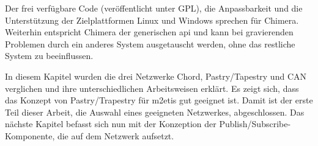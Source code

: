 Der frei verfügbare Code (veröffentlicht unter GPL), die Anpassbarkeit und die Unterstützung der Zielplattformen Linux und Windows sprechen für Chimera. Weiterhin entspricht Chimera der generischen \ac{api} und kann bei gravierenden Problemen durch ein anderes System ausgetauscht werden, ohne das restliche System zu beeinflussen.

In diesem Kapitel wurden die drei Netzwerke Chord, Pastry/Tapestry und CAN verglichen und ihre unterschiedlichen Arbeitsweisen erklärt. Es zeigt sich, dass das Konzept von Pastry/Trapestry für \ac{m2etis} gut geeignet ist. Damit ist der erste Teil dieser Arbeit, die Auswahl eines geeigneten Netzwerkes, abgeschlossen. Das nächste Kapitel befasst sich nun mit der Konzeption der Publish/Subscribe-Komponente, die auf dem Netzwerk aufsetzt.

